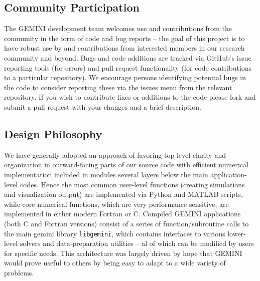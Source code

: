 \documentclass[11pt,letterpaper]{article}
\begin{document}
\subsection{Community Participation}

The GEMINI development team welcomes use and contributions from the community in the form of code and bug reports -- the goal of this project is to have robust use by and contributions from interested members in our research community and beyond.  Bugs and code additions are tracked via GitHub's issue reporting tools (for errors) and pull request functionality (for code contributions to a particular repository).  We encourage persons identifying potential bugs in the code to consider reporting these via the issues menu from the relevant repository.  If you wish to contribute fixes or additions to the code please fork and submit a pull request with your changes and a brief description.  

\subsection{Design Philosophy}

We have generally adopted an approach of favoring top-level clarity and organization in outward-facing parts of our source code with efficient numerical implementation included in modules several layers below the main application-level codes.  Hence the most common user-level functions (creating simulations and visualization output) are implemented via Python and MATLAB scripts, while core numerical functions, which are very performance sensitive, are implemented in either modern Fortran or C.  Compiled GEMINI applications (both C and Fortran versions) consist of a series of function/subroutine calls to the main gemini library \texttt{libgemini}, which contains interfaces to various lower-level solvers and data-preparation utilities -- al of which can be modified by users for specific needs.  This architecture was largely driven by hope that GEMINI would prove useful to others by being easy to adapt to a wide variety of problems. 

\end{document}
